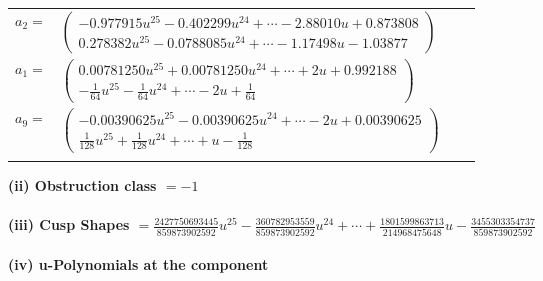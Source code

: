 \documentclass[1p]{elsarticle_modified}
\theoremstyle{definition}
\begin{document}
\begin{tabular}{m{7pt} m{180pt} m{7pt} m{180pt} }
\flushright $a_{2}=$&$\begin{pmatrix}-0.977915 u^{25}-0.402299 u^{24}+\cdots-2.88010 u+0.873808\\0.278382 u^{25}-0.0788085 u^{24}+\cdots-1.17498 u-1.03877\end{pmatrix}$ \\
\flushright $a_{1}=$&$\begin{pmatrix}0.00781250 u^{25}+0.00781250 u^{24}+\cdots+2 u+0.992188\\-\frac{1}{64} u^{25}-\frac{1}{64} u^{24}+\cdots-2 u+\frac{1}{64}\end{pmatrix}$ \\
\flushright $a_{9}=$&$\begin{pmatrix}-0.00390625 u^{25}-0.00390625 u^{24}+\cdots-2 u+0.00390625\\\frac{1}{128} u^{25}+\frac{1}{128} u^{24}+\cdots+u-\frac{1}{128}\end{pmatrix}$\\&\end{tabular}
\flushleft \textbf{(ii) Obstruction class $= -1$}\\~\\
\flushleft \textbf{(iii) Cusp Shapes $= \frac{2427750693445}{859873902592} u^{25}-\frac{360782953559}{859873902592} u^{24}+\cdots+\frac{1801599863713}{214968475648} u-\frac{3455303354737}{859873902592}$}\\~\\
\newpage\renewcommand{\arraystretch}{1}
\flushleft \textbf{(iv) u-Polynomials at the component}\newline \\
\end{document}
